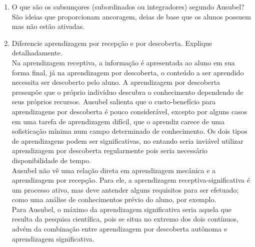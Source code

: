 \documentclass[a4paper, 12pt]{article}
\begin{document}
\begin{enumerate}
\begin{enumerate}
  \item O que são os subsunçores (subordinados ou integradores) segundo Ausubel?\\
    São ideias que proporcionam ancoragem, deias de base que os alunos possuem mas não estão ativadas. 
  \item Diferencie aprendizagem por recepção e por descoberta. Explique detalhadamente.\\
    Na aprendizagem receptiva, a informação é apresentada ao aluno em sua forma final, já na aprendizagem por descoberta, o conteúdo a ser aprendido necessita ser descoberto pelo aluno. A aprendizagem por descoberta pressupõe que o próprio indivíduo descubra o conhecimento dependendo de seus próprios recursos. Ausubel salienta que o custo-benefício para aprendizagens por descoberta é pouco considerável, excepto por alguns casos em uma tarefa de aprendizagem difícil, que o aprendiz carece de uma sofisticação mínima num campo determinado de conhecimento. Os dois tipos de aprendizagens podem ser significativas, no entando seria inviável utilizar aprendizagem por descoberta regularmente pois seria necessário disponibilidade de tempo.\\
    Ausubel não vê uma relação direta em aprendizagem mecânica e a aprendizagem por recepção. Para ele, a aprendizagem receptiva-significativa é um processo ativo, mas deve antender alguns requisitos para ser efetuado; como uma análise de conhecimentos prévio do aluno, por exemplo.\\
    Para Ausubel, o máximo da aprendizagem significativa seria aquela que resulta da pesquisa científica, pois se situa no extremo dos dois contínuos, advém da combinação entre aprendizagem por descoberta autônoma e aprendizagem significativa.
    
    
  \end{enumerate}
\end{enumerate}
\end{document}
